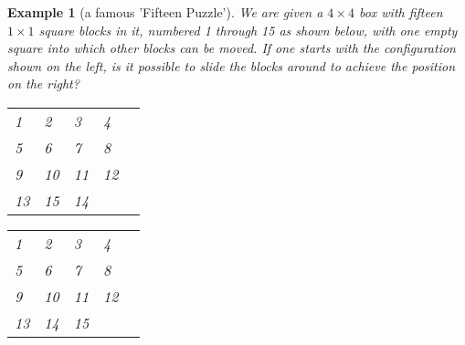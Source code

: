 \documentclass[11pt,a5paper]{article}
\newtheorem{theorem}{Example}
\begin{document}
\begin{theorem}[a famous 'Fifteen Puzzle']
We are given a $4\times4$ box with fifteen $1\times1$ square blocks in it, numbered 1 through 15 as shown below, with one empty square into which other blocks can be moved. If one starts with the configuration shown on the left, is it possible to slide the blocks around to achieve the position on the right? 

\begin{table}[h!]
\centering
\begin{tabular}{|l|l|l|l|l}
\cline{1-4}
 1 & 2 & 3 & 4 &  \\ \cline{1-4}
 5 & 6 & 7 & 8 &  \\ \cline{1-4}
 9 & 10 & 11 & 12 & \\ \cline{1-4}
 13 & 15 & 14 &  &  \\ \cline{1-4}
\end{tabular}
\quad
\begin{tabular}{|l|l|l|l|l}
\cline{1-4}
 1 & 2 & 3 & 4 &  \\ \cline{1-4}
 5 & 6 & 7 & 8 &  \\ \cline{1-4}
 9 & 10 & 11 & 12 & \\ \cline{1-4}
 13 & 14 & 15 &  &  \\ \cline{1-4}
\end{tabular}
\end{table}

\end{theorem}
\end{document}

